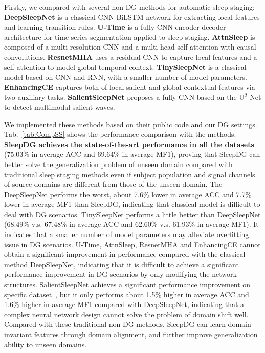 \documentclass[letterpaper]{article} %
\begin{document}
	Firstly, we compared with several non-DG methods for automatic sleep staging:
	\textbf{DeepSleepNet} \citep{Supratak2017DeepSleepNetAM} is a classical CNN-BiLSTM network for extracting local features and learning transition rules.
	\textbf{U-Time} \citep{Perslev2019UTimeAF} is
	a fully-CNN encoder-decoder architecture for time series segmentation applied to sleep staging.
	\textbf{AttnSleep} \citep{Eldele2021AnAD}
	is composed of a multi-resolution CNN  and a multi-head self-attention with causal convolutions.
	\textbf{ResnetMHA} \citep{Qu2020ARB}
	uses a residual CNN to capture local features and a self-attention to model global temporal context.
	\textbf{TinySleepNet} \citep{Supratak2020TinySleepNetAE}
	is a classical model based on CNN and RNN, with a smaller number of model parameters.
	\textbf{EnhancingCE} \citep{Phyo2022EnhancingCE}
	captures both of local salient and global contextual features via two auxiliary tasks.
	\textbf{SalientSleepNet} \citep{Jia2021SalientSleepNetMS}
	proposes a fully CNN based on the U$^2$-Net to detect multimodal salient waves.

	We implemented these methods based on their public code and our DG settings.
	Tab.~\ref{tab:CompSS} shows the performance comparison with the methods.
	\textbf{SleepDG achieves the state-of-the-art performance in all the datasets} (75.03\% in average ACC and 69.64\% in average MF1), proving that SleepDG can better solve the generalization problem of unseen domain compared with traditional sleep staging methods even if subject population and signal channels of source domains are different from those of the unseen domain.
	The DeepSleepNet performs the worst, about 7.6\% lower in average ACC and 7.7\% lower in average MF1 than SleepDG, indicating that classical model is difficult to deal with DG scenarios.
	TinySleepNet performs a little better than DeepSleepNet (68.49\% v.s. 67.48\% in average ACC and 62.60\% v.s. 61.93\% in average MF1).
	It indicates that a smaller number of model parameters may alleviate overfitting issue in DG scenarios.
	U-Time, AttnSleep, ResnetMHA and EnhancingCE cannot obtain a significant improvement in performance compared with the classical method DeepSleepNet, indicating that it is difficult to achieve a significant performance improvement in DG scenarios by only modifying the network structures.
	SalientSleepNet achieves a significant performance improvement on specific dataset~\citep{Jia2021SalientSleepNetMS}, but it only performs about 1.5\% higher in average ACC and 1.6\% higher in average MF1 compared with DeepSleepNet, indicating that a complex neural network design cannot solve the problem of domain shift well.
	Compared with these traditional non-DG methods, SleepDG can learn domain-invariant features through domain alignment, and further improve generalization ability to unseen domains.
\end{document}
